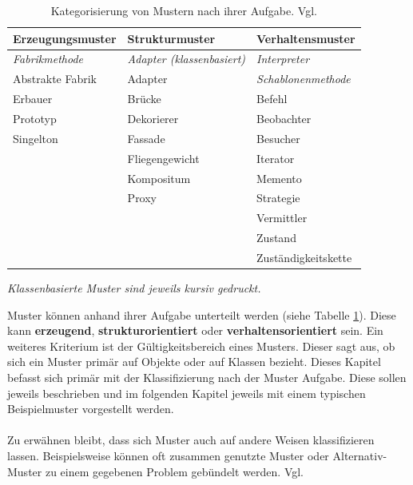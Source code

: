 \documentclass[fontsize=11pt,a4paper,final]{scrreprt}[2003/01/01]
\begin{document}
\begin{table}[H]
	\caption{Kategorisierung von Mustern nach ihrer Aufgabe. Vgl. \cite[S. 14]{gamma2004}}\label{ta:Klassifizierung}
	\begin{center}
		\begin{tabular}{|l|l|l|}
			\hline
			\bf Erzeugungsmuster   & \bf Strukturmuster                & \bf Verhaltensmuster       \\
			\hline
			\textit{Fabrikmethode} & \textit{Adapter (klassenbasiert)} & \textit{Interpreter}       \\
			Abstrakte Fabrik       & Adapter                           & \textit{Schablonenmethode} \\
			Erbauer                & Brücke                           & Befehl                     \\
			Prototyp               & Dekorierer                        & Beobachter                 \\
			Singelton              & Fassade                           & Besucher                   \\
			                       & Fliegengewicht                    & Iterator                   \\
			                       & Kompositum                        & Memento                    \\
			                       & Proxy                             & Strategie                  \\
			                       &                                   & Vermittler                 \\
			                       &                                   & Zustand                    \\
			                       &                                   & Zuständigkeitskette       \\
			\hline
		\end{tabular}
	\end{center}
	\begin{center}
		\small{\textit{Klassenbasierte Muster sind jeweils kursiv gedruckt.}}
	\end{center}
\end{table}

Muster können anhand ihrer Aufgabe unterteilt werden (siehe Tabelle \ref{ta:Klassifizierung}). Diese kann \textbf{erzeugend},\textbf{ strukturorientiert} oder \textbf{verhaltensorientiert} sein. Ein weiteres Kriterium ist der Gültigkeitsbereich eines Musters. Dieser sagt aus, ob sich ein Muster primär auf Objekte oder auf Klassen bezieht.
Dieses Kapitel befasst sich primär mit der Klassifizierung nach der Muster Aufgabe. Diese sollen jeweils beschrieben und im folgenden Kapitel jeweils mit einem typischen Beispielmuster vorgestellt werden. 
\\ \\
Zu erwähnen bleibt, dass sich Muster auch auf andere Weisen klassifizieren lassen. Beispielsweise können oft zusammen genutzte Muster oder Alternativ-Muster zu einem gegebenen Problem gebündelt werden. Vgl. \cite[S. 14]{gamma2004}
\end{document}
